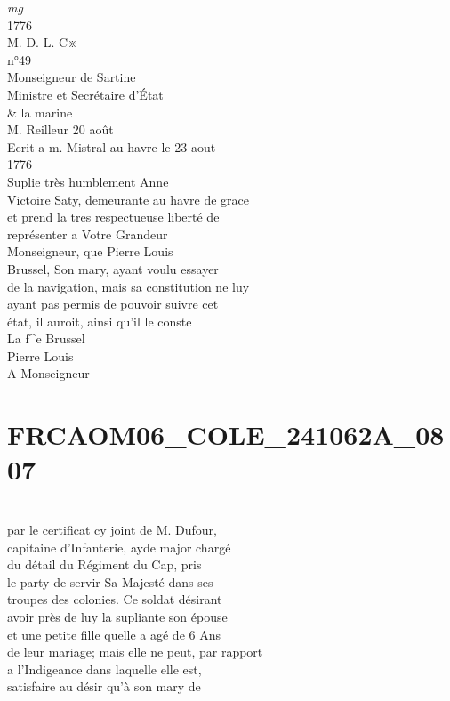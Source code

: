 \documentclass{article}
\begin{document}
\begin{pages}
\vspace{0.5cm}\noindent
\textit{mg}
\footnotesize \\
1776\\
M. D. L. C※\\
n°49
\normalsize \pstart
\\
Monseigneur de Sartine\\
Ministre et Secrétaire d'État\\
\& la marine\\
M. Reilleur 20 août\\
Ecrit a m. Mistral au havre le 23 aout\\
1776\\
Suplie très humblement Anne\\
Victoire Saty, demeurante au havre de grace\\
et prend la tres respectueuse liberté de\\
représenter a Votre Grandeur\\
Monseigneur, que Pierre Louis\\
Brussel, Son mary, ayant voulu essayer\\
de la navigation, mais sa constitution ne luy\\
ayant pas permis de pouvoir suivre cet\\
état, il auroit, ainsi qu'il le conste
\pend\pstart
\\
La f\^{}e Brussel\\
Pierre Louis\\
A Monseigneur
\pend
\endnumbering\beginnumbering\section{FRCAOM06\_COLE\_241062A\_0807}\pstart
\\
par le certificat cy joint de M. Dufour,\\
capitaine d'Infanterie, ayde major chargé\\
du détail du Régiment du Cap, pris\\
le party de servir Sa Majesté dans ses\\
troupes des colonies. Ce soldat désirant\\
avoir près de luy la supliante son épouse\\
et une petite fille quelle a agé de 6 Ans\\
de leur mariage; mais elle ne peut, par rapport\\
a l'Indigeance dans laquelle elle est,\\
satisfaire au désir qu'à son mary de\\

\end{pages}
\end{document}
